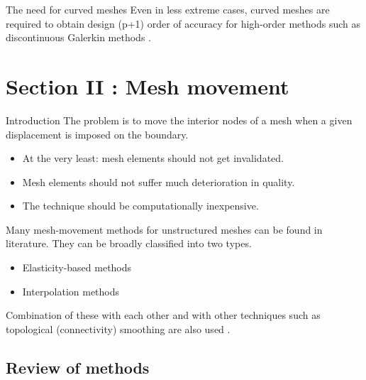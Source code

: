 \documentclass[t,12pt]{beamer}
\begin{document}
\begin{frame}{The need for curved meshes}
Even in less extreme cases, curved meshes are required to obtain design (p+1) order of accuracy for high-order methods such as discontinuous Galerkin methods .
\end{frame}

\section{Section II : Mesh movement}

\begin{frame}{Introduction}
The problem is to move the interior nodes of a mesh when a given displacement is imposed on the boundary.
\begin{itemize}
	\item At the very least: mesh elements should not get invalidated.
	\item Mesh elements should not suffer much deterioration in quality.
	\item The technique should be computationally inexpensive.
\end{itemize}
\end{frame}

\begin{frame}
Many mesh-movement methods for unstructured meshes can be found in literature. They can be broadly classified into two types.
\vspace{0.2in}
\begin{itemize}
	\item Elasticity-based methods
	\item Interpolation methods
\end{itemize}
\vspace{0.2in}
Combination of these with each other and with other techniques such as topological (connectivity) smoothing are also used .
\end{frame}

\subsection{Review of methods}
\end{document}
